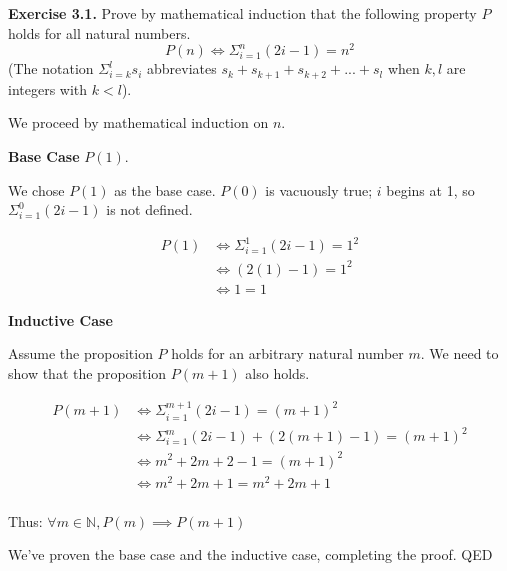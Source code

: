 \documentclass{article}
\begin{document}
  \newcommand{\N}{\mathbb{N}}

  \noindent \textbf{Exercise 3.1.} Prove by mathematical induction that the following property $P$ holds for all natural numbers.
  $$
  P(n) \iff \Sigma^n_{i = 1} (2i - 1) = n^2
  $$
  \noindent (The notation $\Sigma^l_{i = k} s_i$ abbreviates $s_k + s_{k + 1} + s_{k + 2} + ... + s_l$ when $k, l$ are integers with $k < l$).

  \bigskip
  \noindent We proceed by mathematical induction on $n$.

  \bigskip
  \noindent \textbf{Base Case} $P(1)$.

  \medskip
  \noindent We chose $P(1)$ as the base case. $P(0)$ is vacuously true; $i$ begins at 1, so $\Sigma^0_{i = 1}(2i - 1)$ is not defined.

  \begin{align*}
    P(1) &\iff \Sigma^1_{i = 1}(2i - 1) = 1^2 \\
    &\iff (2(1) - 1) = 1^2 \\
    &\iff 1 = 1
  \end{align*}

  \bigskip
  \noindent \textbf{Inductive Case}

  \medskip
  \noindent Assume the proposition $P$ holds for an arbitrary natural number $m$. We need to show that the proposition $P(m + 1)$ also holds.

  \begin{align*}
    P(m + 1) &\iff \Sigma^{m + 1}_{i = 1}(2i - 1) = (m + 1)^2 \\
    &\iff \Sigma^{m}_{i = 1}(2i - 1) + (2(m + 1) - 1) = (m + 1)^2 \\
    &\iff m^2 + 2m + 2 - 1 = (m + 1)^2 \\
    &\iff m^2 + 2m + 1 = m^2 + 2m + 1 \\
  \end{align*}

  \noindent Thus: $\forall m \in \N, P(m) \implies P(m + 1)$
  
  \bigskip
  \noindent We've proven the base case and the inductive case, completing the proof. QED
\end{document}
